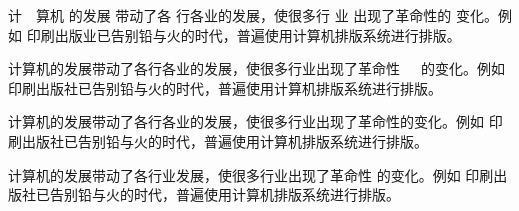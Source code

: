 \documentclass{ctexart}
\begin{document}
计\, \, 算机 \: 的发展\; 带动了各\! 行各业\quad 的发展，使\qquad 很多行\hspace{6mm} 业
出现了革命性的\hspace{-2mm} 变化。例如\hphantom{印刷业} 印刷出版业已告别铅与火的时代，普遍使用计算机排版系统进行排版。

\hspace{6mm} 计算机的发展带动了各行各业的发展，使很多行业出现了革命性\, \, \, 的变化。例如
印刷出版社已告别铅与火的时代，普遍使用计算机排版系统进行排版。

\hspace*{5mm}计算机的发展带动了各行各业的发展，使很多行业出现了革命性\hspace{6mm}的变化。例如
印刷出版社已告别铅与火的时代，普遍使用计算机排版系统进行排版。

计算机的发展带动了各行业发展，使很多行业出现了革命性\hspace*{6mm} 的变化。例如
印刷出版社已告别铅与火的时代，普遍使用计算机排版系统进行排版。
\end{document}
